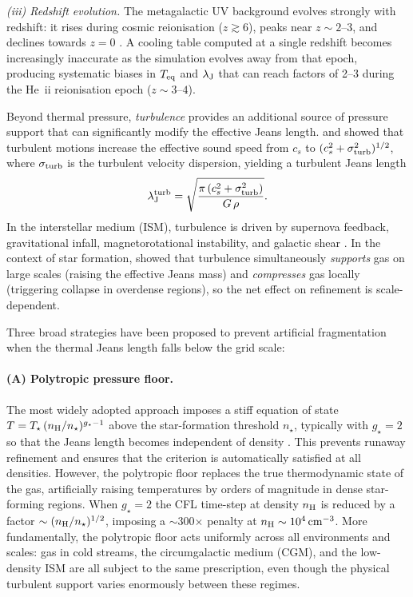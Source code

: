 \documentclass[fleqn,usenatbib]{mnras}
\newcommand{\lJ}{\lambda_{\rm J}}
\newcommand{\nstar}{n_\star}
\newcommand{\gstar}{g_\star}
\begin{document}
\textit{(iii) Redshift evolution.}  The metagalactic UV background
evolves strongly with redshift: it rises during cosmic reionisation
($z \gtrsim 6$), peaks near $z \sim 2$--$3$, and declines towards
$z = 0$ \citep{HM2012, FG2020}.  A cooling table computed at a single
redshift becomes increasingly inaccurate as the simulation evolves
away from that epoch, producing systematic biases in $T_{\rm eq}$ and
$\lJ$ that can reach factors of 2--3 during the He~{\sc ii}
reionisation epoch ($z \sim 3$--$4$).

Beyond thermal pressure, \emph{turbulence} provides an additional
source of pressure support that can significantly modify the effective
Jeans length.  \citet{Chandrasekhar1951} and \citet{Bonazzola1987}
showed that turbulent motions increase the effective sound speed from
$c_s$ to $(c_s^2 + \sigma_{\rm turb}^2)^{1/2}$, where $\sigma_{\rm
turb}$ is the turbulent velocity dispersion, yielding a turbulent
Jeans length
\begin{equation}
  \lJ^{\rm turb} =
  \sqrt{\frac{\pi\,(c_s^2 + \sigma_{\rm turb}^2)}{G\,\rho}}.
  \label{eq:jeans_turb}
\end{equation}
In the interstellar medium (ISM), turbulence is driven by supernova
feedback, gravitational infall, magnetorotational instability, and
galactic shear \citep{Robertson2008, Kim2017, Hopkins2018}.
In the context of star formation,
\citet{Federrath2012} showed that turbulence
simultaneously \emph{supports} gas on large scales (raising the
effective Jeans mass) and \emph{compresses} gas locally (triggering
collapse in overdense regions), so the net effect on refinement is
scale-dependent.

Three broad strategies have been proposed to prevent artificial
fragmentation when the thermal Jeans length falls below the grid
scale:

\paragraph{(A) Polytropic pressure floor.}
The most widely adopted approach imposes a stiff equation of state
$T = T_\star\,(n_{\rm H}/\nstar)^{\gstar-1}$ above the
star-formation threshold $\nstar$, typically with $\gstar = 2$ so
that the Jeans length becomes independent of density
\citep{Truelove1997, Robertson2008, Schaye2015, Teyssier2015,
Hopkins2018}.  This prevents runaway refinement and ensures that the
\citet{Truelove1997} criterion is automatically satisfied at all
densities.  However, the polytropic floor replaces the true
thermodynamic state of the gas, artificially raising temperatures by
orders of magnitude in dense star-forming regions.  When $\gstar = 2$
the CFL time-step at density $n_{\rm H}$ is reduced by a factor
$\sim(n_{\rm H}/\nstar)^{1/2}$, imposing a $\sim$300$\times$ penalty
at $n_{\rm H} \sim 10^4\,{\rm cm^{-3}}$.  More fundamentally, the
polytropic floor acts uniformly across all environments and scales:
gas in cold streams, the circumgalactic medium (CGM), and the
low-density ISM are all subject to the same prescription, even though
the physical turbulent support varies enormously between these
regimes.
\end{document}
